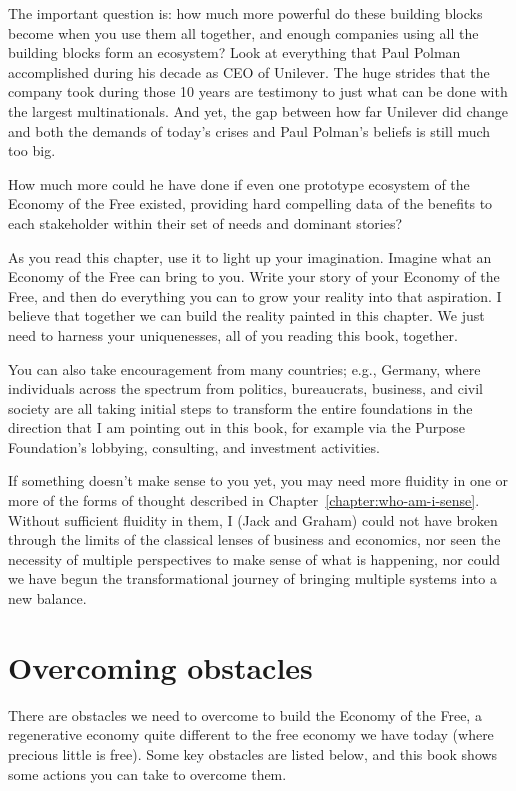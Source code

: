 The important question is: how much more powerful do these building blocks become when you use them all together, and enough companies using all the building blocks form an ecosystem? Look at everything that Paul Polman accomplished during his decade as CEO of Unilever. The huge strides that the company took during those 10 years are testimony to just what can be done with the largest multinationals. And yet, the gap between how far Unilever did change and both the demands of today's crises and Paul Polman's beliefs is still much too big.


How much more could he have done if even one prototype ecosystem of the Economy of the Free existed, providing hard compelling data of the benefits to each stakeholder within their set of needs and dominant stories?


As you read this chapter, use it to light up your imagination. Imagine what an Economy of the Free can bring to you. Write your story of your Economy of the Free, and then do everything you can to grow your reality into that aspiration. I believe that together we can build the reality painted in this chapter. We just need to harness your uniquenesses, all of you reading this book, together.


You can also take encouragement from many countries; e.g., Germany, where individuals across the spectrum from politics, bureaucrats, business, and civil society are all taking initial steps to transform the entire foundations in the direction that I am pointing out in this book, for example via the Purpose Foundation's lobbying, consulting, and investment activities. 


If something doesn't make sense to you yet, you may need more fluidity in one or more of the forms of thought described in Chapter~\ref{chapter:who-am-i-sense}. Without sufficient fluidity in them, I (Jack and Graham) could not have broken through the limits of the classical lenses of business and economics, nor seen the necessity of multiple perspectives to make sense of what is happening, nor could we have begun the transformational journey of bringing multiple systems into a new balance. 


\section{Overcoming obstacles}
There are obstacles we need to overcome to build the Economy of the Free, a regenerative economy quite different to the free economy we have today (where precious little is free). Some key obstacles are listed below, and this book shows some actions you can take to overcome them.


